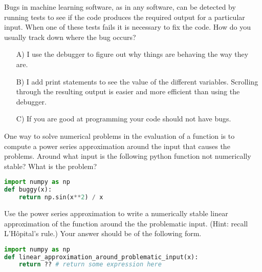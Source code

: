 \documentclass{harvardml}
\begin{document}

\begin{problem}
Bugs in machine learning software, as in any software, can be detected by running
tests to see if the code produces the required output for a particular input.
When one of these tests fails it is necessary to fix the code.  How do you usually track down where
the bug occurs?
\begin{itemize}
\item[A)] I use the debugger to figure out why things are behaving the way they are.
\item[B)] I add print statements to see the value of the different variables.
Scrolling through the resulting output is easier and more efficient than using the debugger.
\item[C)] If you are good at programming your code should not have bugs.
\end{itemize}

\end{problem}


\begin{problem}[Stability]
One way to solve numerical problems in the evaluation of a function is to compute
a power series approximation around the input that causes the problems.
Around what input is the following python function not numerically stable?
What is the problem?

\begin{lstlisting}[language=python]
import numpy as np
def buggy(x):
    return np.sin(x**2) / x
\end{lstlisting}
Use the power series approximation to write a numerically stable linear approximation of the function around the the problematic input. (Hint: recall L'H\^opital's rule.) Your answer should be of the following form.

\begin{lstlisting}[language=python]
import numpy as np
def linear_approximation_around_problematic_input(x):
    return ?? # return some expression here
\end{lstlisting}
\end{problem}
\end{document}
